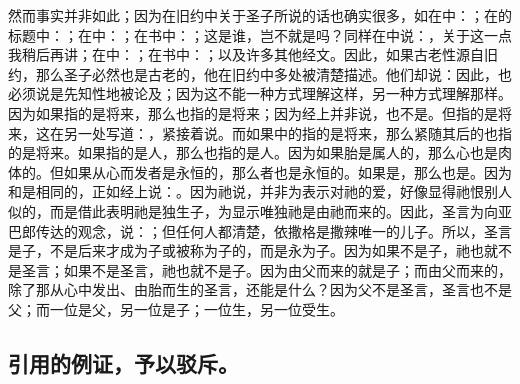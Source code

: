然而事实并非如此；因为在旧约中关于圣子所说的话也确实很多，如在中：；在的标题中：；在中：；在书中：；这是谁，岂不就是吗？同样在中说：，关于这一点我稍后再讲；在中：；在书中：；以及许多其他经文。因此，如果古老性源自旧约，那么圣子必然也是古老的，他在旧约中多处被清楚描述。他们却说：因此，也必须说是先知性地被论及；因为这不能一种方式理解这样，另一种方式理解那样。因为如果指的是将来，那么也指的是将来；因为经上并非说，也不是。但指的是将来，这在另一处写道：，紧接着说。而如果中的指的是将来，那么紧随其后的也指的是将来。如果指的是人，那么也指的是人。因为如果胎是属人的，那么心也是肉体的。但如果从心而发者是永恒的，那么者也是永恒的。如果是，那么也是。因为和是相同的，正如经上说：。因为祂说，并非为表示对祂的爱，好像显得祂恨别人似的，而是借此表明祂是独生子，为显示唯独祂是由祂而来的。因此，圣言为向亚巴郎传达的观念，说：；但任何人都清楚，依撒格是撒辣唯一的儿子。所以，圣言是子，不是后来才成为子或被称为子的，而是永为子。因为如果不是子，祂也就不是圣言；如果不是圣言，祂也就不是子。因为由父而来的就是子；而由父而来的，除了那从心中发出、由胎而生的圣言，还能是什么？因为父不是圣言，圣言也不是父；而一位是父，另一位是子；一位生，另一位受生。\par


\subsection{引用的例证，予以驳斥。}

